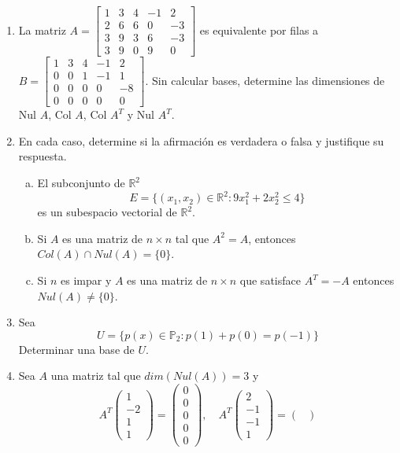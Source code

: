 \documentclass[12pt]{article}
\newenvironment{preguntas}
{\begin{enumerate}\itemsep12pt
	}
	{
	\end{enumerate}
}
\newcommand{\R}{\mathbb{R}}
\begin{document}
\begin{preguntas}
$$W = \{p(x) \in V: p(1) = p(0) =0\}$$
Demostrar que $W$ es subespacio de $V$.
\item La matriz $A = \begin{bmatrix}
	1 & 3 & 4 & -1 & 2\\
	2 & 6 & 6 & 0 & -3\\
	3 & 9 & 3 & 6 & -3\\
	3 & 9 & 0 & 9 & 0
	\end{bmatrix}$ es equivalente por filas a $B = \begin{bmatrix}
	1 & 3 & 4 & -1 & 2\\
	0 & 0 & 1 & -1 & 1\\
	0 & 0 & 0 & 0 & -8\\
	0 & 0 & 0 & 0 & 0
	\end{bmatrix}$. Sin calcular bases, determine las dimensiones de Nul $A$, Col $A$, Col $A^T$ y Nul $A^T$.
\item En cada caso, determine si la afirmación es verdadera o falsa y justifique su respuesta.
\begin{enumerate}[a)]
\item El subconjunto de $\R^2$
		$$E=\{(x_1, x_2) \in \R^2:9x_1^2+2x_2^2 \leq 4\}$$
		es un subespacio vectorial de $\R^2$.
\item Si $A$ es una matriz de $n \times n$ tal que $A^2=A$, entonces $Col(A) \cap Nul(A) = \{0\}$.
\item Si $n$ es impar y $A$ es una matriz de $n\times n$ que satisface $A^T = -A$ entonces $Nul(A) \neq \{0\}$.
\end{enumerate}
\item Sea 
	$$U=\{p(x) \in \mathbb{P}_2 : p(1) + p(0) = p(-1)\}$$
	Determinar una base de $U$.
\item Sea $A$ una matriz tal que $dim(Nul(A)) = 3$ y
	$$A^T \begin{pmatrix}
	1 \\ -2 \\ 1 \\ 1
	\end{pmatrix} = \begin{pmatrix}
	0 \\ 0 \\ 0 \\ 0 \\ 0
	\end{pmatrix}, \quad A^T \begin{pmatrix}
	2 \\ -1 \\ -1 \\ 1
	\end{pmatrix} = \begin{pmatrix}

\end{pmatrix}$$
\end{preguntas}
\end{document}
